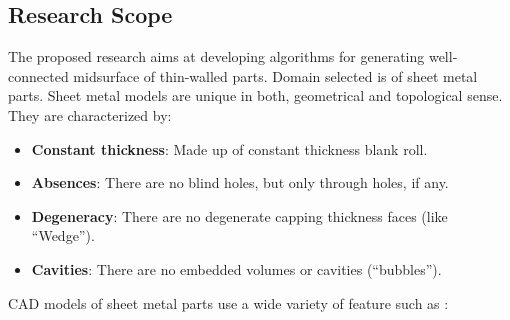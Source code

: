  \subsection{Research Scope}
The proposed research aims at developing algorithms for generating well-connected midsurface of thin-walled parts. Domain selected is of sheet metal parts. Sheet metal models are unique in both, geometrical and topological sense. They are characterized by:
\begin{itemize}[noitemsep,topsep=2pt,parsep=2pt,partopsep=2pt]
\item \textbf{Constant thickness}: Made up of constant thickness blank roll.
\item \textbf{Absences}: There are no blind holes, but only through holes, if any. 
\item \textbf{Degeneracy}: There are no degenerate capping thickness faces (like ``Wedge'').
\item \textbf{Cavities}: There are no embedded volumes or cavities (``bubbles'').
\end{itemize}


CAD models of sheet metal parts use a wide variety of feature such as \cite{Liu2004}:

